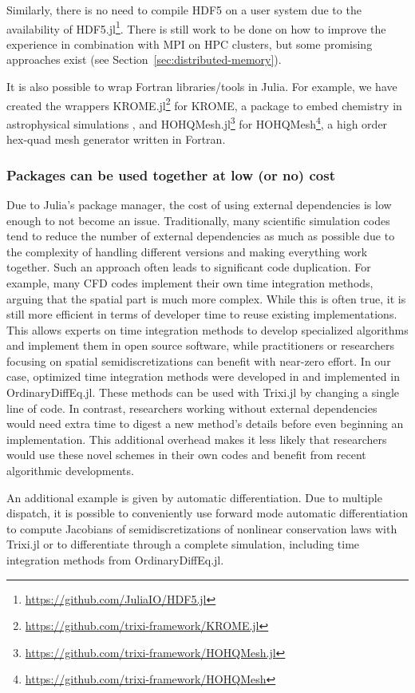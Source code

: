 \documentclass[hidelinks]{juliacon} %
\newcommand{\trixi}{Trixi.jl\xspace}
\begin{document}
Similarly, there is no need to compile HDF5 on a user system due to the
availability of HDF5.jl\footnote{\url{https://github.com/JuliaIO/HDF5.jl}}.
There is still work to be done on how to improve the experience in combination
with MPI on HPC clusters, but some promising
approaches exist (see Section~\ref{sec:distributed-memory}).

It is also possible to wrap Fortran libraries/tools in Julia. For example, we
have created the wrappers KROME.jl\footnote{\url{https://github.com/trixi-framework/KROME.jl}}
for KROME, a package to embed chemistry in astrophysical simulations
\cite{grassi2014krome}, and HOHQMesh.jl\footnote{\url{https://github.com/trixi-framework/HOHQMesh.jl}}
for HOHQMesh\footnote{\url{https://github.com/trixi-framework/HOHQMesh}}, a high order
hex-quad mesh generator written in Fortran.

\subsubsection{Packages can be used together at low (or no) cost}

Due to Julia's package manager, the cost of using external dependencies is low
enough to not become an issue. Traditionally, many scientific simulation codes tend
to reduce the number of external dependencies as much as possible due to the
complexity of handling different versions and making everything work together.
Such an approach often leads to significant code duplication. For example, many
CFD codes implement their own time integration methods, arguing that the spatial
part is much more complex. While this is often true, it is still more efficient
in terms of developer time to reuse existing implementations. This
allows experts on time integration methods to develop specialized algorithms and
implement them in open source software, while practitioners or researchers focusing
on spatial semidiscretizations can benefit with near-zero effort.
In our case, optimized time integration methods were developed in
\cite{ranocha2021optimized} and implemented in OrdinaryDiffEq.jl. These methods
can be used with \trixi by changing a single line of code. In contrast, researchers
working without external dependencies would need extra time to digest a new method's
details before even beginning an implementation. This additional overhead
makes it less likely that researchers would use these novel schemes in their own
codes and benefit from recent algorithmic developments.

An additional example is given by automatic differentiation. Due to multiple dispatch,
it is possible to conveniently use forward mode automatic differentiation
\cite{revels2016forward} to compute Jacobians of semidiscretizations of nonlinear
conservation laws with \trixi or to differentiate through a complete simulation,
including time integration methods from OrdinaryDiffEq.jl.
\end{document}
